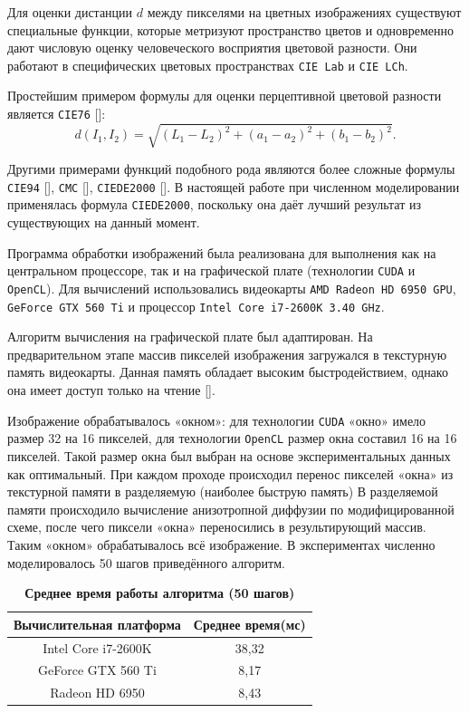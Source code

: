 Для оценки дистанции $d$ между пикселями на цветных изображениях
существуют специальные функции, которые метризуют пространство
цветов и одновременно дают числовую оценку человеческого восприятия
цветовой разности. Они работают в специфических цветовых 
пространствах {\tt CIE Lab} и {\tt CIE LCh}.

Простейшим примером формулы для оценки перцептивной цветовой разности является {\tt CIE76} []:
$$
d (I_1, I_2) = \sqrt{(L_1 - L_2)^2 + (a_1 - a_2)^2 + (b_1 - b_2)^2} .
$$

Другими примерами функций подобного рода являются более сложные 
формулы {\tt CIE94} [], {\tt CMC} [], 
{\tt CIEDE2000} []. 
В настоящей работе при численном моделировании применялась формула {\tt CIEDE2000},
поскольку она даёт лучший результат из существующих на данный момент.

\smallskip

Программа обработки изображений была реализована  для  выполнения как на центральном процессоре, так и на графической плате (технологии {\tt CUDA} и {\tt OpenCL}).
Для вычислений использовались видеокарты {\tt AMD Radeon HD 6950 GPU}, {\tt GeForce GTX 560 Ti} 
и процессор {\tt Intel Core i7-2600K 3.40 GHz}. 

Алгоритм вычисления на графической плате был адаптирован. 
На предварительном этапе массив пикселей изображения загружался в текстурную память видеокарты.
Данная память обладает высоким быстродействием, однако она имеет доступ только на чтение []. 



Изображение обрабатывалось «окном»: для технологии {\tt CUDA} «окно» имело размер 32 на 16 пикселей, 
для технологии {\tt OpenCL} размер окна составил 16 на 16 пикселей. 
Такой размер окна был выбран на основе экспериментальных данных как оптимальный. 
При каждом проходе происходил перенос пикселей «окна» из текстурной памяти в разделяемую 
(наиболее быструю память) В разделяемой памяти происходило вычисление анизотропной диффузии по модифицированной схеме, 
после чего пиксели «окна» переносились в результирующий массив. Таким «окном» обрабатывалось всё изображение. 
В экспериментах численно моделировалось 50 шагов приведённого алгоритм. 

\begin{table}
\centering
\small 
\caption{\bf Среднее время работы алгоритма (50 шагов) }\vspace{-3mm}
\begin{tabular}{c|c}
\hline \footnotesize Вычислительная платформа & \footnotesize  Среднее время(мс) \\
\hline
\rule{0mm}{12pt}%
Intel Core i7-2600K & 38,32  \\
GeForce GTX 560 Ti & 8,17   \\
Radeon HD 6950 & 8,43   \\
\hline
\end{tabular} 

\end{table}

